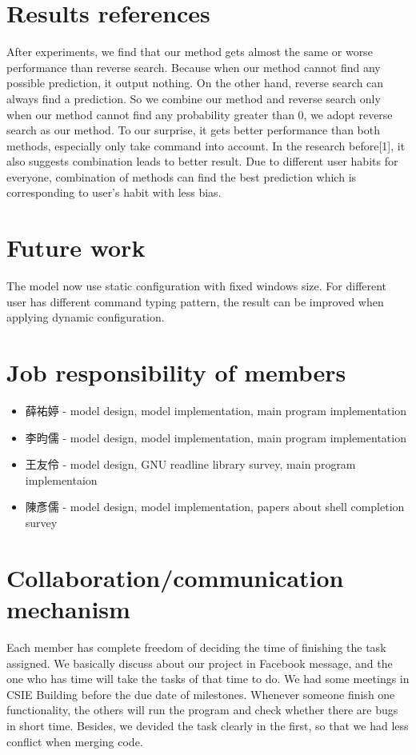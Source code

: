 \documentclass[11pt,a4paper]{article}
\begin{document}
\section*{Results references}
After experiments, we find that our method gets almost the same or worse performance than reverse search. 
Because when our method cannot find any possible prediction, it output nothing.
On the other hand, reverse search can always find a prediction.
So we combine our method and reverse search only when our method cannot find any probability greater than 0,
we adopt reverse search as our method. 
To our surprise, it gets better performance than both methods, especially only take command into account. 
In the research before[1], it also suggests combination leads to better result. 
Due to different user habits for everyone, 
combination of methods can find the best prediction which is corresponding to user's habit with less bias.

\section*{Future work}

The model now use static configuration with fixed windows size.
For different user has different command typing pattern, 
the result can be improved when applying dynamic configuration.

\section*{Job responsibility of members}

\begin{CJK}{UTF8}{bsmi}
\begin{itemize}
\item 薛祐婷 - model design, model implementation, main program implementation
\item 李昀儒 - model design, model implementation, main program implementation
\item 王友伶 - model design, GNU readline library survey, main program implementaion
\item 陳彥儒 - model design, model implementation, papers about shell completion survey
\end{itemize}
\end{CJK}

\section*{Collaboration/communication mechanism}
Each member has complete freedom of deciding the time of finishing the task assigned.
We basically discuss about our project in Facebook message, 
and the one who has time will take the tasks of that time to do.
We had some meetings in CSIE Building before the due date of milestones. 
Whenever someone finish one functionality, 
the others will run the program and check whether there are bugs in short time.
Besides, we devided the task clearly in the first, 
so that we had less conflict when merging code.
\end{document}
